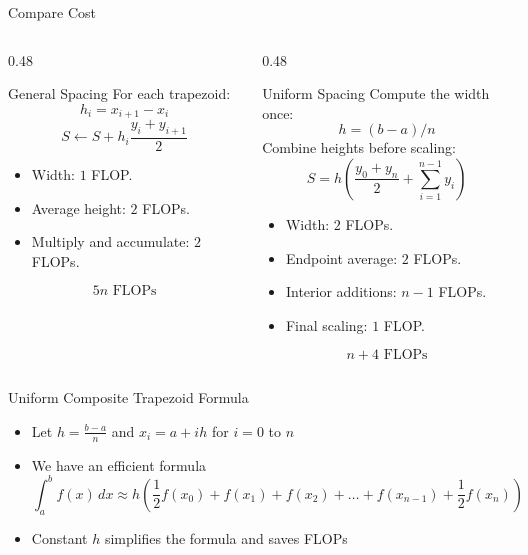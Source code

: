 \documentclass[10pt]{beamer}
\begin{document}
\begin{frame}[fragile]{Compare Cost}

\begin{columns}[T]
\begin{column}{0.48\textwidth}
\begin{block}{General Spacing}
For each trapezoid:
\[
    h_i=x_{i+1}-x_i
\]
\[
    S \leftarrow S+h_i\frac{y_i+y_{i+1}}{2}
\]

\begin{itemize}
    \item Width: $1$ FLOP.
    \item Average height: $2$ FLOPs.
    \item Multiply and accumulate: $2$ FLOPs.
\end{itemize}

\[
    \boxed{5n \text{ FLOPs}}
\]
\end{block}
\end{column}

\begin{column}{0.48\textwidth}
\begin{block}{Uniform Spacing}
Compute the width once:
\[
    h=(b-a)/n
\]
Combine heights before scaling:
\[
    S=h\left(\frac{y_0+y_n}{2}
      +\sum_{i=1}^{n-1}y_i\right)
\]

\begin{itemize}
    \item Width: $2$ FLOPs.
    \item Endpoint average: $2$ FLOPs.
    \item Interior additions: $n-1$ FLOPs.
    \item Final scaling: $1$ FLOP.
\end{itemize}

\[
    \boxed{n+4 \text{ FLOPs}}
\]
\end{block}
\end{column}
\end{columns}


\end{frame}
\begin{frame}[fragile]{Uniform Composite Trapezoid Formula}


\begin{itemize}
\item Let $h = \frac{b-a}{n}$ and $x_i = a+ih$ for $ i = 0$ to $n$
\item We have an efficient formula 
$$
    \int_a^b f(x)\,dx \approx    h    \left(\frac{1}{2} f(x_0) +   f(x_1) +  f(x_2) + \dots +   f(x_{n-1}) + \frac{1}{2} f(x_n)\right)
$$
\item Constant $h$ simplifies the formula and saves FLOPs
\end{itemize}
\end{frame}
\end{document}

